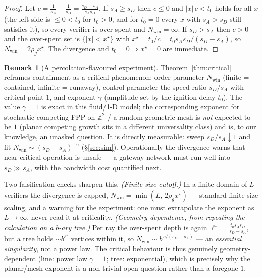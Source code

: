 \documentclass[11pt]{article}
\theoremstyle{plain}
\theoremstyle{definition}
\newtheorem{remark}{Remark}
\newcommand{\Nwin}{N_{\mathrm{win}}}
\begin{document}
\begin{proof}
Let $c=\tfrac1{s_A}-\tfrac1{s_D}=\tfrac{s_D-s_A}{s_As_D}$. If $s_A\ge s_D$ then
$c\le0$ and $|x|\,c<t_0$ holds for all $x$ (the left side is $\le0<t_0$ for $t_0>0$,
and for $t_0=0$ every $x$ with $s_A>s_D$ still satisfies it), so every verifier is
over-spent and $\Nwin=\infty$. If $s_D>s_A$ then $c>0$ and the over-spent set is
$\{|x|<x^\star\}$ with $x^\star=t_0/c=t_0 s_As_D/(s_D-s_A)$, so $\Nwin=2\rho_g
x^\star$. The divergence and $t_0=0\Rightarrow x^\star=0$ are immediate.
\end{proof}

\begin{remark}[A percolation-flavoured experiment]
Theorem~\ref{thm:critical} reframes containment as a critical phenomenon: order
parameter $\Nwin$ (finite = contained, infinite = runaway), control parameter the
speed ratio $s_D/s_A$ with critical point $1$, and exponent $\gamma$ (amplitude set
by the ignition delay $t_0$). The value $\gamma=1$ is exact in this fluid/1-D model;
the corresponding exponent for stochastic competing FPP on $\mathbb{Z}^2$ / a random
geometric mesh is \emph{not} expected to be $1$ (planar competing growth sits in a
different universality class) and is, to our knowledge, an unasked question. It is
directly measurable: sweep $s_D/s_A\downarrow1$ and fit
$\Nwin\sim(s_D-s_A)^{-\gamma}$ (\S\ref{sec:sim}). Operationally the divergence warns
that near-critical operation is unsafe --- a gateway network must run well into
$s_D\gg s_A$, with the bandwidth cost quantified next.

Two falsification checks sharpen this. \emph{(Finite-size cutoff.)} In a finite
domain of $L$ verifiers the divergence is capped, $\Nwin=\min(L,\,2\rho_g
x^\star)$ --- standard finite-size scaling, and a warning for the experiment: one
must extrapolate the exponent as $L\to\infty$, never read it at criticality.
\emph{(Geometry-dependence, from repeating the calculation on a $b$-ary tree.)} Per
ray the over-spent depth is again $\ell^\star=\tfrac{t_0 s_A s_D}{s_D-s_A}$, but a
tree holds $\sim b^{\ell^\star}$ vertices within it, so $\Nwin\sim
b^{\,c/(s_D-s_A)}$ --- an \emph{essential singularity}, not a power law. The critical
behaviour is thus genuinely geometry-dependent (line: power law $\gamma=1$; tree:
exponential), which is precisely why the planar/mesh exponent is a non-trivial open
question rather than a foregone $1$.
\end{remark}

\end{document}
